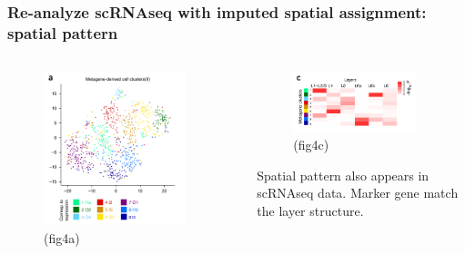 \documentclass{beamer}
\begin{document}
  \begin{frame}
  \frametitle{Re-analyze scRNAseq with imputed spatial assignment: spatial pattern}
  \begin{columns}
  \begin{column}{0.5\textwidth}
    \begin{figure}
      \centering
      \includegraphics[width=0.9\textwidth]{glu_tsne} (fig4a)
    \end{figure}
  \end{column}
  \begin{column}{0.5\textwidth}
    \begin{figure}
      \centering
      \includegraphics[width=0.9\textwidth]{glu_ana} (fig4c)
    \end{figure}
    Spatial pattern also appears in scRNAseq data. Marker gene match the layer structure.
  \end{column}
  \end{columns}
  \end{frame}
\end{document}
